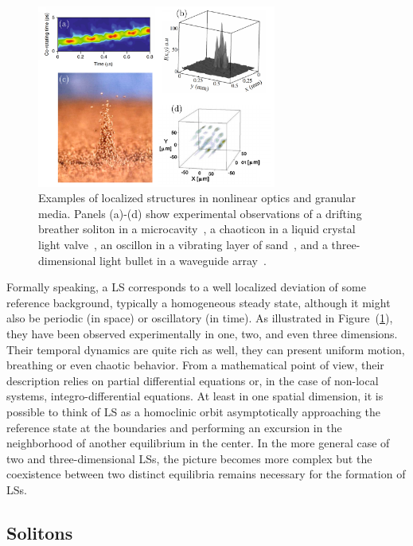 \begin{figure}[h]
    \centering
    \includegraphics[width=0.7\textwidth]{imagenes/framework/LS/examples_ls.pdf}
    \caption{Examples of localized structures in nonlinear optics and granular media. Panels (a)-(d) show experimental observations of a drifting breather
    soliton in a microcavity~\cite{yi2018imaging}, a chaoticon in a liquid crystal light 
    valve~\cite{verschueren2013spatiotemporal}, an oscillon in a vibrating
    layer of sand~\cite{umbanhowar1996localized,aranson2006patterns}, and a three-dimensional
    light bullet in a waveguide array~\cite{minardi2010three}.}
    \label{fig:pre_ls_examplesls}
\end{figure}

Formally speaking, a LS corresponds to a well localized deviation of some reference background,
typically a homogeneous steady state, although it might also be periodic (in space) or oscillatory (in time).
As illustrated in Figure~(\ref{fig:pre_ls_examplesls}), they have been observed experimentally in one, two, and even three dimensions.
Their temporal dynamics are quite rich as well, they can present uniform motion, breathing or even chaotic behavior.
From a mathematical point of view, their description relies on partial differential equations or,
in the case of non-local systems, integro-differential equations. At least in one spatial dimension,
it is possible to think of LS as a homoclinic orbit asymptotically approaching the reference state
at the boundaries and performing an excursion in the neighborhood of another equilibrium in the center.
In the more general case of two and three-dimensional LSs, the picture becomes more complex but the
coexistence between two distinct equilibria remains necessary for the formation of LSs.


\subsection{Solitons}

